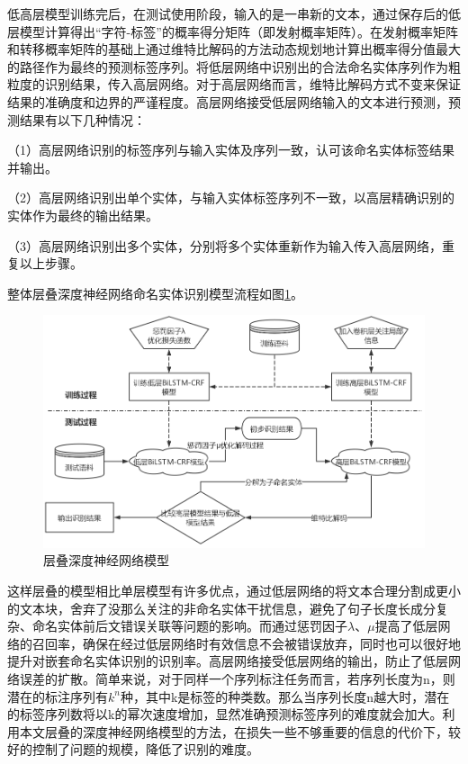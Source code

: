 \documentclass[winfonts,master,oneside,nobackinfo]{njuthesis}
\begin{document}
低高层模型训练完后，在测试使用阶段，输入的是一串新的文本，通过保存后的低层模型计算得出“字符-标签”的概率得分矩阵（即发射概率矩阵）。在发射概率矩阵和转移概率矩阵的基础上通过维特比解码的方法动态规划地计算出概率得分值最大的路径作为最终的预测标签序列。将低层网络中识别出的合法命名实体序列作为粗粒度的识别结果，传入高层网络。对于高层网络而言，维特比解码方式不变来保证结果的准确度和边界的严谨程度。高层网络接受低层网络输入的文本进行预测，预测结果有以下几种情况：

（1）高层网络识别的标签序列与输入实体及序列一致，认可该命名实体标签结果并输出。

（2）高层网络识别出单个实体，与输入实体标签序列不一致，以高层精确识别的实体作为最终的输出结果。

（3）高层网络识别出多个实体，分别将多个实体重新作为输入传入高层网络，重复以上步骤。

整体层叠深度神经网络命名实体识别模型流程如图\ref{high-low}。

\begin{figure}[h]
\centering
\includegraphics[width=1\textwidth]{./figure/层叠模型流程.jpg}
\caption{层叠深度神经网络模型}
\label{high-low}
\end{figure}

这样层叠的模型相比单层模型有许多优点，通过低层网络的将文本合理分割成更小的文本块，舍弃了没那么关注的非命名实体干扰信息，避免了句子长度长成分复杂、命名实体前后文错误关联等问题的影响。而通过惩罚因子$\lambda$、$\mu$提高了低层网络的召回率，确保在经过低层网络时有效信息不会被错误放弃，同时也可以很好地提升对嵌套命名实体识别的识别率。高层网络接受低层网络的输出，防止了低层网络误差的扩散。简单来说，对于同样一个序列标注任务而言，若序列长度为n，则潜在的标注序列有$k^n$种，其中k是标签的种类数。那么当序列长度n越大时，潜在的标签序列数将以k的幂次速度增加，显然准确预测标签序列的难度就会加大。利用本文层叠的深度神经网络模型的方法，在损失一些不够重要的信息的代价下，较好的控制了问题的规模，降低了识别的难度。
\end{document}
